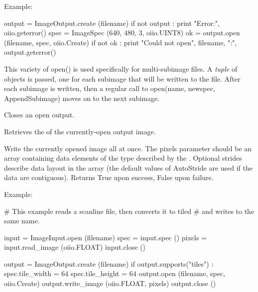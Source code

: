 \noindent Example:
\begin{code}
    output = ImageOutput.create (filename)
    if not output :
        print "Error:", oiio.geterror()
    spec = ImageSpec (640, 480, 3, oiio.UINT8)
    ok = output.open (filename, spec, oiio.Create)
    if not ok :
        print "Could not open", filename, ":", output.geterror()
\end{code}
\apiend

This variety of {\cf open()} is used specifically for multi-subimage files.
A \emph{tuple} of \ImageSpec objects is passed, one for each subimage
that will be written to the file.  After each subimage is written, then
a regular call to {\cf open(name, newspec, {\ce AppendSubimage})} moves
on to the next subimage.
\apiend

Closes an open output.
\apiend

Retrieves the \ImageSpec of the currently-open output image.
\apiend

Write the currently opened image all at once.  The {\cf pixels} parameter
should be an {\cf array} containing data elements of the type described by
the \TypeDesc.  Optional strides describe data layout in the array (the
default values of {\cf AutoStride} are used if the data are contiguous).
Returns {\cf True} upon success, {\cf False} upon failure.

\noindent Example:
\begin{code}
    # This example reads a scanline file, then converts it to tiled
    # and writes to the same name.

    input = ImageInput.open (filename)
    spec = input.spec ()
    pixels = input.read_image (oiio.FLOAT)
    input.close ()

    output = ImageOutput.create (filename)
    if output.supports("tiles") :
        spec.tile_width = 64
        spec.tile_height = 64
        output.open (filename, spec, oiio.Create)
        output.write_image (oiio.FLOAT, pixels)
        output.close ()
\end{code}
\apiend


